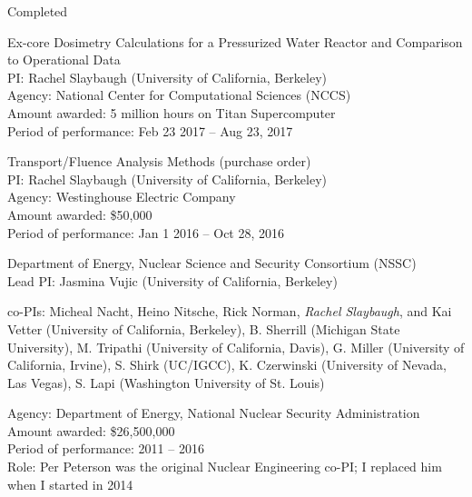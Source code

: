 \begin{rSubsection}{Completed}{}{}{}
\vspace*{0.3 em}
\item Ex-core Dosimetry Calculations for a Pressurized Water Reactor and Comparison to Operational Data\\ 
PI: Rachel Slaybaugh (University of California, Berkeley)\\
Agency: National Center for Computational Sciences (NCCS)\\
Amount awarded: 5 million hours on Titan Supercomputer\\
Period of performance: Feb 23 2017 -- Aug 23, 2017

\vspace*{0.3 em}
\item Transport/Fluence Analysis Methods (purchase order)\\ 
PI: Rachel Slaybaugh (University of California, Berkeley)\\
Agency: Westinghouse Electric Company\\
Amount awarded: \$50,000\\
Period of performance: Jan 1 2016 -- Oct 28, 2016

\vspace*{0.3 em}
\item Department of Energy, Nuclear Science and Security Consortium (NSSC)\\
Lead PI: Jasmina Vujic (University of California, Berkeley)
\vspace*{-.6 em}
\begin{addmargin}[1em]{0 em}
co-PIs: Micheal Nacht, Heino Nitsche, Rick Norman, \textit{Rachel Slaybaugh}, and Kai Vetter (University of California, Berkeley), B. Sherrill  (Michigan State University), M. Tripathi (University of California, Davis), G. Miller (University of California, Irvine), S. Shirk (UC/IGCC), K. Czerwinski (University of Nevada, Las Vegas), S. Lapi (Washington University of St. Louis)
\end{addmargin}
\vspace*{-.6 em}
Agency:  Department of Energy, National Nuclear Security Administration\\
Amount awarded: \$26,500,000\\
Period of performance: 2011 -- 2016\\
Role: Per Peterson was the original Nuclear Engineering co-PI; I replaced him when I started in 2014
\end{rSubsection}


